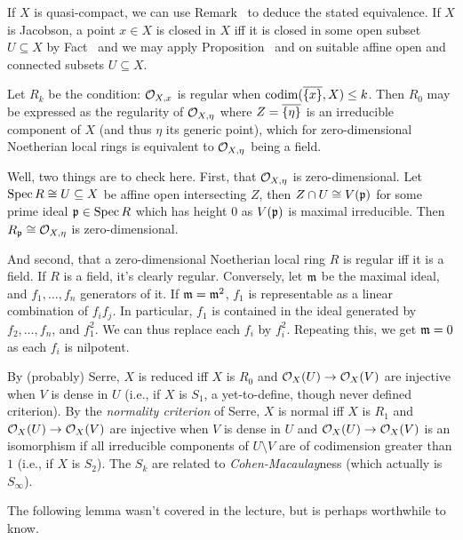 \documentclass[a4paper,parskip=half,numbers=enddot, DIV=12]{scrreprt}
\begin{document}
\begin{rem}
\begin{alphanumerate}
         If $X$ is quasi-compact, we can use Remark~ to deduce the stated equivalence. If $X$ is Jacobson, a point $x\in X$ is closed in $X$ iff it is closed in some open subset $U\subseteq X$ by Fact~ and we may apply Proposition~ and  on suitable affine open and connected subsets $U\subseteq X$.
    \item 
        Let $R_k$ be the condition: $\mathcal{O}_{X,x}$ is regular when $\operatorname{codim}(\overline{\{x\}}, X) \leq k$. Then $R_0$ may be expressed as the regularity of $\mathcal{O}_{X,\eta}$ where $Z=\overline{\left\{\eta\right\}}$ is an irreducible component of $X$ (and thus $\eta$ its generic point), which for zero-dimensional Noetherian local rings is equivalent to $\mathcal{O}_{X,\eta}$ being a field. 
        
        Well, two things are to check here. First, that $\mathcal{O}_{X,\eta}$ is zero-dimensional. Let $\operatorname{Spec} R\cong U\subseteq X$ be affine open intersecting $Z$, then $Z\cap U\cong V(\mathfrak{p})$ for some prime ideal $\mathfrak{p}\in\operatorname{Spec} R$ which has height $0$ as $V(\mathfrak{p})$ is maximal irreducible. Then $R_{\mathfrak{p}}\cong \mathcal{O}_{X,\eta}$ is zero-dimensional.  
        
        And second, that a zero-dimensional Noetherian local ring $R$ is regular iff it is a field. If $R$ is a field, it's clearly regular. Conversely, let $\mathfrak{m}$ be the maximal ideal, and $f_1,\ldots,f_n$ generators of it. If $\mathfrak{m}=\mathfrak{m}^2$, $f_1$ is representable as a linear combination of $f_if_j$. In particular, $f_1$ is contained in the ideal generated by $f_2,\ldots,f_n$, and $f_1^2$. We can thus replace each $f_i$ by $f_i^2$. Repeating this, we get $\mathfrak{m}=0$ as each $f_i$ is nilpotent.
        
          By (probably) Serre, $X$ is reduced iff $X$ is $R_0$ and $\Oo_X(U)\morphism \Oo_X(V)$ are injective when $V$ is dense in $U$ (i.e., if $X$ is $S_1$, a yet-to-define, though never defined criterion). By the \emph{normality criterion} of Serre, $X$ is normal iff $X$ is $R_1$ and $\Oo_X(U)\morphism \Oo_X(V)$ are injective when $V$ is dense in $U$ and $\Oo_X(U)\morphism \Oo_X(V)$ is an isomorphism if all irreducible components of $U\setminus V$ are of codimension greater than $1$ (i.e., if $X$ is $S_2$). The $S_k$ are related  to \emph{Cohen-Macaulay}ness (which actually is $S_\infty$).
    \end{alphanumerate}
\end{rem}
The following lemma wasn't covered in the lecture, but is perhaps worthwhile to know.
\end{document}
